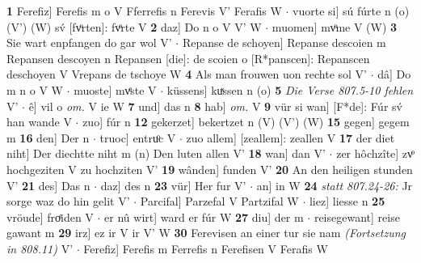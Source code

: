 \documentclass[8pt,a4paper,notitlepage]{article}
\begin{document}
\begin{table}[ht]
\begin{minipage}[t]{0.5\linewidth}
\textbf{1} Ferefiz] Ferefis m o V Fferrefis n Ferevis V' Ferafis W  $\cdot$ vuorte si] sú fúrte n (o) (V') (W) sv́ [fvͦrten]: fvͦrte  V \textbf{2} daz] Do n o V V' W  $\cdot$ muomen] mvͦme V (W) \textbf{3} Sie wart enpfangen do gar wol V'  $\cdot$ Repanse de schoyen] Repanse descoien m Repansen descoyen n Repansen [die]: de scoien o [R*panscen]: Repanscen deschoyen V Vrepans de tschoye W \textbf{4} Als man frouwen uon rechte sol V'  $\cdot$ dâ] Do m n o V W  $\cdot$ muoste] mvͤste V  $\cdot$ küssens] kuͯssen n (o) \textbf{5} \textit{Die Verse 807.5-10 fehlen} V'   $\cdot$ ê] vil o \textit{om.} V ie W \textbf{7} und] das n \textbf{8} hab] \textit{om.} V \textbf{9} vür si wan] [F*de]: Fúr sv́ han wande V  $\cdot$ zuo] fúr n \textbf{12} gekerzet] bekertzet n (V) (V') (W) \textbf{15} gegen] gegem m \textbf{16} den] Der n  $\cdot$ truoc] entruͦc V  $\cdot$ zuo allem] [zeallem]: zeallen V \textbf{17} der diet niht] Der diechtte niht m (n) Den luten allen V' \textbf{18} wan] dan V'  $\cdot$ zer hôchzîte] zvͦ hochgeziten V zu hochziten V' \textbf{19} wânden] funden V' \textbf{20} An den heiligen stunden V' \textbf{21} des] Das n  $\cdot$ daz] des n \textbf{23} vür] Her fur V'  $\cdot$ an] in W \textbf{24} \textit{statt 807.24-26:} Jr sorge waz do hin gelit V'   $\cdot$ Parcifal] Parzefal V Partzifal W  $\cdot$ liez] liesse n \textbf{25} vröude] froͤiden V  $\cdot$ er nû wirt] ward er fúr W \textbf{27} diu] der m  $\cdot$ reisegewant] reise gawant m \textbf{29} irz] ez ir V ir V' W \textbf{30} Ferevisen an einer tur sie nam \textit{(Fortsetzung in 808.11)} V'  $\cdot$ Ferefiz] Ferefis m Ferrefis n Ferefisen V Ferafis W \newline
\end{minipage}
\end{table}
\newpage
\end{document}
